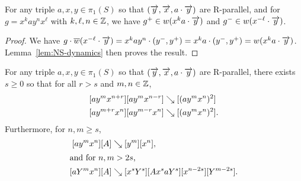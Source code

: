 \begin{lemma}\label{lem:ayx-window}
  For any triple $a,x,y\in\pi_1(S)$ so that
  $(\overrightarrow{y},\overrightarrow{x},a\cdot\overrightarrow{y})$ are R-parallel, and for
  $g=x^k ay^n x^\ell$ with $k,\ell,n\in\mathbb{Z}$, we have
  $g^+ \in w(x^k a \cdot\overrightarrow{y})$ and
  $g^- \in w(x^{-\ell}\cdot\overrightarrow{y})$.
\end{lemma}

\begin{proof}
  We have
  $g \cdot \overline{w}(x^{-\ell} \cdot \overrightarrow{y}) = x^k ay^n
  \cdot(y^-,y^+) = x^k a\cdot (y^-,y^+) = w(x^k a \cdot \overrightarrow{y})$.
  Lemma~\ref{lem:NS-dynamics} then proves the result.
\end{proof}

\begin{proposition}\label{prop:fundamental-ayx}
  For any triple $a,x,y\in\pi_1(S)$ so that $(\overrightarrow{y},\overrightarrow{x},a\cdot\overrightarrow{y})$ are R-parallel, there exists
  $s \ge 0$ so that for all $r > s$ and $m,n \in \mathbb{Z}$,
  \begin{align}
    \label{eq:crossuniform_n}
       [a y^m x^{n+r}][a y^m x^{n-r}] &\mathrel{\searrow} [(a y^m x^n)^2]\\
    \label{eq:crossuniform_m}
       [a y^{m+r} x^n][a y^{m-r} x^n] &\mathrel{\searrow} [(a y^m x^n)^2].
  \end{align}
  Furthermore, for $n,m \ge s$,
  \begin{align}\label{eq:cancel-ayx}
    [a y^m x^n][A] &\mathrel{\searrow} [y^m][x^n],\\
    \intertext{and for $n,m > 2s$,}
    \label{eq:crossbelowy}
    [a Y^m x^n][A] &\mathrel{\searrow} [x^s Y^s] [A x^s a Y^s] [x^{n-2s}] [Y^{m-2s}].
  \end{align}
\end{proposition}

